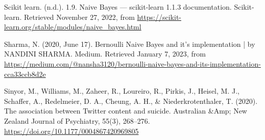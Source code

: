 \documentclass[runningheads]{llncs}
\begin{document}
\begin{thebibliography}{9}
\bibitem{}
Scikit learn. (n.d.). 1.9. Naive Bayes — scikit-learn 1.1.3 documentation. Scikit-learn. Retrieved November 27, 2022, from \url{https://scikit-learn.org/stable/modules/naive\_bayes.html}

\bibitem{}
Sharma, N. (2020, June 17). Bernoulli Naive Bayes and it’s implementation | by NANDINI SHARMA. Medium. Retrieved January 7, 2023, from \url{https://medium.com/@nansha3120/bernoulli-naive-bayes-and-its-implementation-cca33ccb8d2e}

\bibitem{}
Sinyor, M., Williams, M., Zaheer, R., Loureiro, R., Pirkis, J., Heisel, M. J., Schaffer, A., Redelmeier, D. A., Cheung, A. H., & Niederkrotenthaler, T. (2020). The association between Twitter content and suicide. Australian &Amp; New Zealand Journal of Psychiatry, 55(3), 268–276. \url{https://doi.org/10.1177/0004867420969805}

\end{thebibliography}
\end{document}
